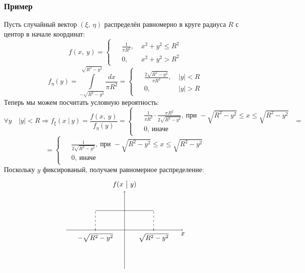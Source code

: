 \documentclass[12pt, a4paper]{article}
\begin{document}
    \subsubsection*{Пример}
    Пусть случайный вектор $(\xi,\ \eta)$ распределён равномерно в круге радиуса $R$ с центор в начале координат:
    \[f(x,\ y) = \begin{cases}
        \begin{aligned}
            &\frac{1}{\pi R^2},\ & x^2 + y^2 \leq R^2\\
            &0,\ & x^2 + y^2 > R^2
        \end{aligned}
    \end{cases}\]
    \[f_{\eta}(y) = \int\limits_{-\sqrt{R^2 - y^2}}^{\sqrt{R^2 - y^2}} \frac{dx}{\pi R^2} = \begin{cases}
        \begin{aligned}
            &\frac{2\sqrt{R^2 - y^2}}{\pi R^2},\ & |y| < R\\
            &0,\ & |y| > R
        \end{aligned}
    \end{cases}\]
    Теперь мы можем посчитать условную вероятность:
    \[\forall y\quad |y| < R\Rightarrow f_{\xi}(x\ \big|\ y) = \frac{f(x,\ y)}{f_{\eta}(y)} = \begin{cases}
        \begin{aligned}
            &\frac{1}{\pi R^2}\cdot \frac{\pi R^2}{2\sqrt{R^2 - y^2}},\ \text{при } -\sqrt{R^2 - y^2} \leq x \leq \sqrt{R^2 - y^2}\\
            &0,\ \text{иначе}
        \end{aligned}
    \end{cases} =\]
    \[= \begin{cases}
        \begin{aligned}
            &\frac{1}{2\sqrt{R^2 - y^2}},\ \text{при } -\sqrt{R^2 - y^2} \leq x \leq \sqrt{R^2 - y^2}\\
            &0,\ \text{иначе}
        \end{aligned}
    \end{cases}\]
    Поскольку $y$ фиксированый, получаем равномерное распределение:
    \[\begin{tikzpicture}
        \draw[->] (-3, 0) -- (3, 0) node[anchor=north]{$x$};
        \draw[->] (0, -2) -- (0, 2) node[anchor=south]{$f(x\ \big|\ y)$};
        \draw (-1.5, 1) -- (1.5, 1);
        \draw (-1.5, 0.05) -- (-1.5, -0.05) node[anchor=north]{$-\sqrt{R^2 - y^2}$};
        \draw (1.5, 0.05) -- (1.5, -0.05) node[anchor=north]{$\sqrt{R^2 - y^2}$};
        \draw[dashed] (-1.5, 0) -- (-1.5, 1);
        \draw[dashed] (1.5, 0) -- (1.5, 1);
    \end{tikzpicture}\]
\end{document}
